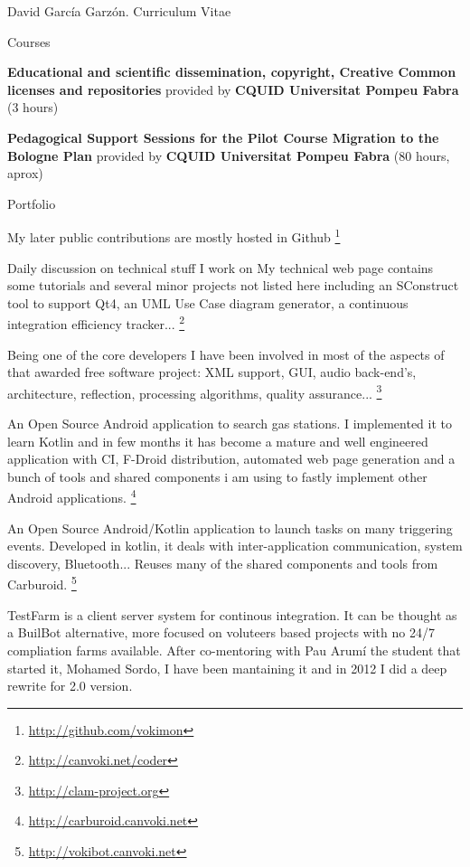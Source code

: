\documentclass{article}
\begin{document}
\begin{cv}{David García Garzón. Curriculum Vitae}
\begin{cvlist}{Courses}
\item[Nov 2012]
	{\bf Educational and scientific dissemination, copyright, Creative Common licenses and repositories } provided by {\bf CQUID Universitat Pompeu Fabra} (3 hours)

\item[May 2007]
	{\bf Pedagogical Support Sessions for the Pilot Course Migration to the Bologne Plan } provided by {\bf CQUID Universitat Pompeu Fabra} (80 hours, aprox)

\end{cvlist}

\begin{cvlist}{Portfolio}
\item[Personal GitHub page]
My later public contributions are mostly hosted in Github
\footnote{\href{http://github.com/vokimon}{http://github.com/vokimon}}
\item[My technical blog and web page]
Daily discussion on technical stuff I work on My technical web page contains some tutorials and several minor projects not listed here including an SConstruct tool to support Qt4, an UML Use Case diagram generator, a continuous integration efficiency tracker...
\footnote{\href{http://canvoki.net/coder}{http://canvoki.net/coder}}
\item[CLAM (C++ Library of Audio and Music)]
Being one of the core developers I have been involved in most of the aspects of that awarded free software project: XML support, GUI, audio back-end's, architecture, reflection, processing algorithms, quality assurance...
\footnote{\href{http://clam-project.org}{http://clam-project.org}}
\item[Carburoid]
An Open Source Android application to search gas stations. I implemented it to learn Kotlin and in few months it has become a mature and well engineered application with CI, F-Droid distribution, automated web page generation and a bunch of tools and shared components i am using to fastly implement other Android applications.
\footnote{\href{http://carburoid.canvoki.net}{http://carburoid.canvoki.net}}
\item[VokiBot]
An Open Source Android/Kotlin application to launch tasks on many triggering events. Developed in kotlin, it deals with inter-application communication, system discovery, Bluetooth... Reuses many of the shared components and tools from Carburoid.
\footnote{\href{http://vokibot.canvoki.net}{http://vokibot.canvoki.net}}
\item[TestFarm]
TestFarm is a client server system for continous integration. It can be thought as a BuilBot alternative, more focused on voluteers based projects with no 24/7 compliation farms available. After co-mentoring with Pau Arumí the student that started it, Mohamed Sordo, I have been mantaining it and in 2012 I did a deep rewrite for 2.0 version.

\end{cvlist}
\end{cv}
\end{document}
